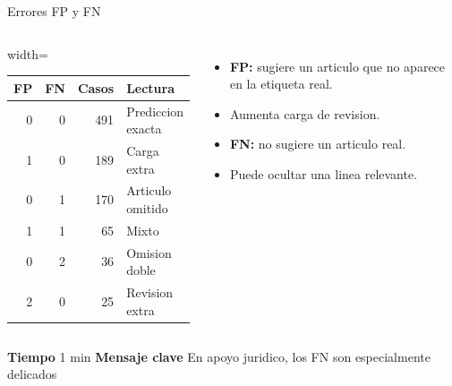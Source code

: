 \documentclass[aspectratio=169,10pt]{beamer}
\newcommand{\slidemeta}[2]{
  \vfill
  {\scriptsize\color{Muted}\textbf{Tiempo} #1 \hfill \textbf{Mensaje clave} #2}
}
\begin{document}
\begin{frame}{Errores FP y FN}
  \begin{columns}[T,onlytextwidth]
    \begin{adjustbox}{width=\linewidth}
      \begin{tabular}{rrrl}
        \toprule
        \textbf{FP} & \textbf{FN} & \textbf{Casos} & \textbf{Lectura}\\
        \midrule
        0 & 0 & 491 & Prediccion exacta\\
        1 & 0 & 189 & Carga extra\\
        0 & 1 & 170 & Articulo omitido\\
        1 & 1 & 65 & Mixto\\
        0 & 2 & 36 & Omision doble\\
        2 & 0 & 25 & Revision extra\\
        \bottomrule
      \end{tabular}
    \end{adjustbox}
    \begin{itemize}
      \item \textbf{FP:} sugiere un articulo que no aparece en la etiqueta real.
      \item Aumenta carga de revision.
      \item \textbf{FN:} no sugiere un articulo real.
      \item Puede ocultar una linea relevante.
    \end{itemize}
  \end{columns}
  \slidemeta{1 min}{En apoyo juridico, los FN son especialmente delicados}
\end{frame}
\end{document}
